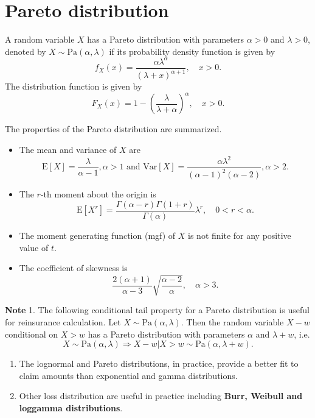 \documentclass[landscape, 20pt]{extreport}
\theoremstyle{definition}
\theoremstyle{definition}
\theoremstyle{definition}
\theoremstyle{definition}
\theoremstyle{remark}
\begin{document}
\hypertarget{pareto-distribution}{%
\section{Pareto distribution}\label{pareto-distribution}}

A random variable \(X\) has a Pareto distribution with parameters
\(\alpha > 0\) and \(\lambda > 0\), denoted by
\(X \sim \text{Pa}(\alpha, \lambda)\) if its probability density function
is given by
\[f_X(x) = \frac{\alpha \lambda^\alpha}{(\lambda + x)^{\alpha + 1}}, \quad x > 0.\]
The distribution function is given by
\[F_X(x) = 1 - \left(  \frac{\lambda}{\lambda + \alpha} \right)^\alpha, \quad x > 0.\]

The properties of the Pareto distribution are summarized.

\begin{itemize}
\item
  The mean and variance of \(X\) are
  \[\mathrm{E}[X] = \frac{\lambda}{\alpha - 1}, \alpha > 1 \text{ and } \mathrm{Var}[X] = \frac{\alpha \lambda^2}{(\alpha - 1)^2(\alpha - 2)}, \alpha > 2.\]
\item
  The \(r\)-th moment about the origin is
  \[\mathrm{E}[X^r] =\frac{\Gamma(\alpha-r) \Gamma(1+ r)}{\Gamma(\alpha)} \lambda^r, \quad 0 < r < \alpha.\]
\item
  The moment generating function (mgf) of \(X\) is not finite for any
  positive value of \(t\).
\item
  The coefficient of skewness is
  \[\frac{2(\alpha + 1)}{\alpha - 3} \sqrt{\frac{\alpha-2}{\alpha}} , \quad \alpha > 3.\]
\end{itemize}

\textbf{Note}
1. The following conditional tail property for a Pareto distribution is
useful for reinsurance calculation. Let
\(X \sim \text{Pa}(\alpha, \lambda)\). Then the random variable
\(X - w\) conditional on \(X > w\) has a Pareto distribution with
parameters \(\alpha\) and \(\lambda + w\), i.e.
\[X \sim \text{Pa}(\alpha, \lambda)\Rightarrow  X - w | X > w \sim \text{Pa}(\alpha,\lambda + w).\]

\begin{enumerate}
\def\labelenumi{\arabic{enumi}.}
\setcounter{enumi}{1}
\item
  The lognormal and Pareto distributions, in practice, provide a
  better fit to claim amounts than exponential and gamma
  distributions.
\item
  Other loss distribution are useful in practice including \textbf{Burr,
  Weibull and loggamma distributions}.
\end{enumerate}
\end{document}
